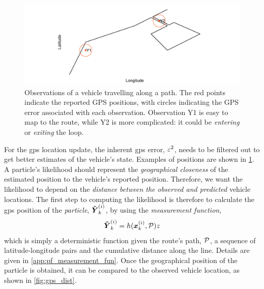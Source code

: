 \begin{knitrout}\small
{}\color{fgcolor}\begin{figure}
\includegraphics[width=\maxwidth]{figure/lhood_obs-1} \caption[Observations of a vehicle travelling along a path]{Observations of a vehicle travelling along a path. The red points indicate the reported GPS positions, with circles indicating the GPS error associated with each observation. Observation Y1 is easy to map to the route, while Y2 is more complicated: it could be \emph{entering} or \emph{exiting} the loop.}\label{fig:lhood_obs}
\end{figure}


\end{knitrout}





For the \gls{gps} location update, the inherent \gls{gps} error, $\varepsilon^2$, needs to be filtered out to get better estimates of the vehicle's state. Examples of positions are shown in \cref{fig:lhood_obs}. A particle's likelihood should represent the \emph{geographical closeness} of the estimated position to the vehicle's reported position. Therefore, we want the likelihood to depend on the \emph{distance between the observed and predicted} vehicle locations. The first step to computing the likelihood is therefore to calculate the \gls{gps} position of the \emph{particle}, $\boldsymbol{\tilde Y}^{(i)}_k$, by using the \emph{measurement function},
\begin{equation}
\label{eq:pf_measurement_fun}
\boldsymbol{\tilde Y}^{(i)}_k = h(\boldsymbol x^{(i)}_k, \mathcal{P})z
\end{equation}
which is simply a deterministic function given the route's path, $\mathcal{P}$, a sequence of latitude-longitude pairs and the cumulative distance along the line. Details are given in \cref{app:pf_measurement_fun}. Once the geographical position of the particle is obtained, it can be compared to the observed vehicle location, as shown in \cref{fig:gps_dist}.

